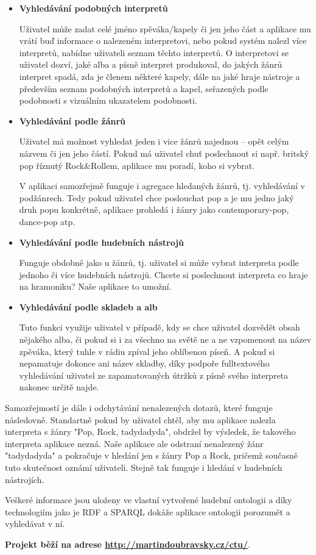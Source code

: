 \begin{itemize}
\item[] \textbf{Vyhledávání podobných interpretů}
    
    Uživatel může zadat celé jméno zpěváka/kapely či jen jeho část a aplikace mu vrátí buď informace o nalezeném interpretovi, nebo pokud systém nalezl více interpretů, nabídne uživateli seznam těchto interpretů. 
    O interpretovi se uživatel dozví, jaké alba a písně interpret produkoval, do jakých žánrů interpret spadá, zda je členem některé kapely, dále na jaké hraje nástroje a především seznam podobných interpretů a kapel, seřazených podle podobnosti s vizuálním ukazatelem podobnosti.
    
\item[] \textbf{Vyhledávání podle žánrů}
    
    Uživatel má možnost vyhledat jeden i vice žánrů najednou – opět celým názvem či jen jeho částí. Pokud má uživatel chuť poslechnout si např. britský pop říznutý Rock\&Rollem, aplikace mu poradí, koho si vybrat.
    
    V aplikaci samozřejmě funguje i agregace hledaných žánrů, tj. vyhledávání v podžánrech. Tedy pokud uživatel chce poslouchat pop a je mu jedno jaký druh popu konkrétně, aplikace prohledá i žánry jako contemporary-pop, dance-pop atp.

\item[] \textbf{Vyhledávání podle hudebních nástrojů}
    
    Funguje obdobně jako u žánrů, tj. uživatel si může vybrat interpreta podle jednoho či více hudebních nástrojů. Chcete si poslechnout interpreta co hraje na hramoniku? Naše aplikace to umožní.

\item[] \textbf{Vyhledávání podle skladeb a alb}
    
    Tuto funkci využije uživatel v případě, kdy se chce uživatel dozvědět obsah nějakého alba, či pokud si i za všechno na světě ne a ne vzpomenout na název zpěváka, který tuhle v rádiu zpíval jeho oblíbenou píseň. A pokud si nepamatuje dokonce ani název skladby, díky podpoře fulltextového vyhledávání uživatel ze zapamatovaných útržků z písně svého interpreta nakonec určitě najde.
\end{itemize}
Samozřejmostí je dále i odchytávání nenalezených dotazů, které funguje následovně.
Standartně pokud by uživatel chtěl, aby mu aplikace nalezla interpreta s žánry "Pop, Rock, tadydadyda", obdržel by výsledek, že takového interpreta aplikace nezná.
Naše aplikace ale odstraní nenalezený žánr "tadydadyda" a pokračuje v hledání jen s žánry Pop a Rock, pričemž současně tuto skutečnost oznámí uživateli.
Stejně tak funguje i hledání v hudebních nástrojích.

\vspace*{12pt}

Veškeré informace jsou uloženy ve vlastní vytvořené hudební ontologii a díky technologiím jako je RDF a SPARQL dokáže aplikace ontologii porozumět a vyhledávat v ní.
 
\vspace*{12pt}

\textbf{Projekt běží na adrese \url{http://martindoubravsky.cz/ctu/}}.